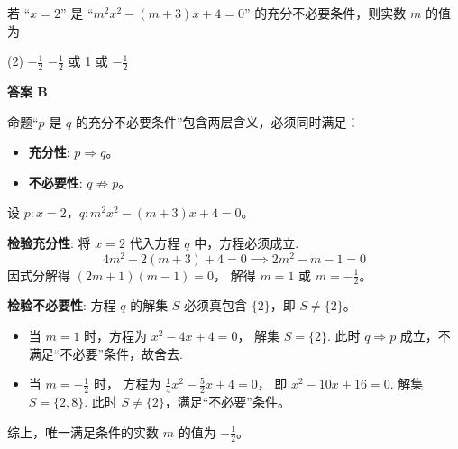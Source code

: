 \begin{choice}[topic={充分不必要条件的应用}]
若 ``$x=2$'' 是 ``$m^2x^2 - (m+3)x + 4 = 0$'' 的充分不必要条件，则实数 $m$ 的值为
\begin{tasks}(2)
	\task $-\frac{1}{2}$
	\task $-\frac{1}{2}$ 或 1
	 或 $-\frac{1}{2}$
\end{tasks}
\end{choice}
\begin{choice-sol}
\textbf{答案 B}

命题``$p$ 是 $q$ 的充分不必要条件''包含两层含义，必须同时满足：
\begin{itemize}
	\item \textbf{充分性}: $p \Rightarrow q$。
	\item \textbf{不必要性}: $q \not\Rightarrow p$。
\end{itemize}
设 $p: x=2$，$q: m^2x^2 - (m+3)x + 4 = 0$。

\textbf{检验充分性}:
将 $x=2$ 代入方程 $q$ 中，方程必须成立.
\[ 4m^2 - 2(m+3) + 4 = 0 \implies 2m^2 - m - 1 = 0 \]
因式分解得 $(2m+1)(m-1) = 0$，
解得 $m=1$ 或 $m=-\frac{1}{2}$。

\textbf{检验不必要性}:
方程 $q$ 的解集 $S$ 必须真包含 $\{2\}$，即 $S \neq \{2\}$。
\begin{itemize}
	\item 当 $m=1$ 时，方程为 $x^2 - 4x + 4 = 0$，
	解集 $S=\{2\}$.
	此时 $q \Rightarrow p$ 成立，不满足``不必要''条件，故舍去.
	\item 当 $m=-\frac{1}{2}$ 时，
	方程为 $\frac{1}{4}x^2 - \frac{5}{2}x + 4 = 0$，
	即 $x^2 - 10x + 16 = 0$.
	解集 $S=\{2, 8\}$.
	此时 $S \neq \{2\}$，满足``不必要''条件。
\end{itemize}
综上，唯一满足条件的实数 $m$ 的值为 $-\frac{1}{2}$。
\end{choice-sol}
